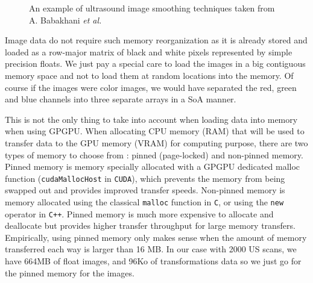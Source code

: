 \documentclass[12pt,journal,compsoc]{IEEEtran}
\begin{document}
\begin{figure}[!ht]
\centering
{}
\hfil
{}
\caption{An example of ultrasound image smoothing techniques taken from A. Babakhani \textit{et al.}\textbf{\cite{1}}}
\label{comparisson_smoothing}
\end{figure}

Image data do not require such memory reorganization as it is already stored and loaded as a row-major matrix of black and white pixels represented by simple precision floats. We just pay a special care to load the images in a big contiguous memory space and not to load them at random locations into the memory.
Of course if the images were color images, we would have separated the red, green and blue channels into three separate arrays in a SoA manner. \par

This is not the only thing to take into account when loading data into memory when using GPGPU.
When allocating CPU memory (RAM) that will be used to transfer data to the GPU memory (VRAM) for computing purpose, there are two types of memory to choose from : pinned (page-locked) and non-pinned memory. 
Pinned memory is memory specially allocated with a GPGPU dedicated malloc function (\texttt{cudaMallocHost} in \texttt{CUDA}), which prevents the memory from being swapped out and provides improved transfer speeds. 
Non-pinned memory is memory allocated using the classical \texttt{malloc} function in \texttt{C}, or using the \texttt{new} operator in \texttt{C++}. 
Pinned memory is much more expensive to allocate and deallocate but provides higher transfer throughput for large memory transfers.
Empirically, using pinned memory only makes sense when the amount of memory transferred each way is larger than 16 MB. 
In our case with 2000 US scans, we have 664MB of float images, and 96Ko of transformations data so we just go for the pinned memory for the images. \par
\end{document}
